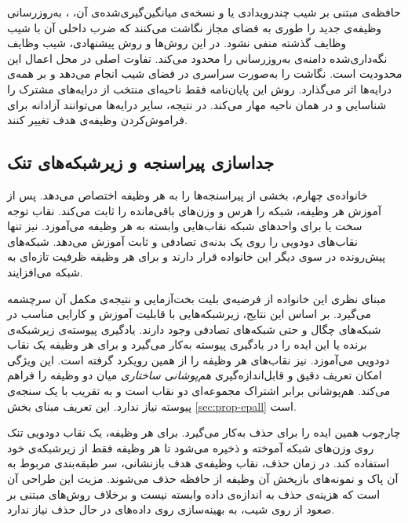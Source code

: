 {حافظه‌ی مبتنی بر شیب چندرویدادی} یا  \cite{lopezpaz2017gem} و نسخه‌ی میانگین‌گیری‌شده‌ی آن،  \cite{chaudhry2019agem}، به‌روزرسانی وظیفه‌ی جدید را طوری به فضای مجاز نگاشت می‌کنند که ضرب داخلی آن با شیب وظایف گذشته منفی نشود. در این روش‌ها و روش پیشنهادی، شیب وظایف نگه‌داری‌شده دامنه‌ی به‌روزرسانی را محدود می‌کند. تفاوت اصلی در محل اعمال این محدودیت است.  نگاشت را به‌صورت سراسری در فضای شیب انجام می‌دهد و بر همه‌ی درایه‌ها اثر می‌گذارد. روش این پایان‌نامه فقط ناحیه‌ای منتخب از درایه‌های مشترک را شناسایی و در همان ناحیه مهار می‌کند. در نتیجه، سایر درایه‌ها می‌توانند آزادانه برای فراموش‌کردن وظیفه‌ی هدف تغییر کنند.

\subsection{جداسازی پیراسنجه و زیرشبکه‌های تنک}
\label{subsec:lit-isolation}

خانواده‌ی چهارم، بخشی از پیراسنجه‌ها را به هر وظیفه اختصاص می‌دهد.  \cite{mallya2018packnet} پس از آموزش هر وظیفه، شبکه را هرس و وزن‌های باقی‌مانده را ثابت می‌کند. {نقاب توجه سخت} یا  \cite{serra2018hat} برای واحدهای شبکه نقاب‌هایی وابسته به هر وظیفه می‌آموزد.  \cite{wortsman2020supsup} نیز تنها نقاب‌های دودویی را روی یک بدنه‌ی تصادفی و ثابت آموزش می‌دهد. {شبکه‌های پیش‌رونده} \cite{rusu2016progressive} در سوی دیگر این خانواده قرار دارند و برای هر وظیفه ظرفیت تازه‌ای به شبکه می‌افزایند.

مبنای نظری این خانواده از {فرضیه‌ی بلیت بخت‌آزمایی} \cite{frankle2019lottery} و نتیجه‌ی مکمل آن \cite{ramanujan2020hidden} سرچشمه می‌گیرد. بر اساس این نتایج، زیرشبکه‌هایی با قابلیت آموزش و کارایی مناسب در شبکه‌های چگال و حتی شبکه‌های تصادفی وجود دارند. {یادگیری پیوسته‌ی زیرشبکه‌ی برنده} یا  \cite{kang2022wsn} این ایده را در یادگیری پیوسته به‌کار می‌گیرد و برای هر وظیفه یک نقاب دودویی می‌آموزد.  نیز نقاب‌های هر وظیفه را از همین رویکرد گرفته است. این ویژگی امکان تعریف دقیق و قابل‌اندازه‌گیری \emph{هم‌پوشانی ساختاری} میان دو وظیفه را فراهم می‌کند. هم‌پوشانی برابر اشتراک مجموعه‌ای دو نقاب است و به تقریب با یک سنجه‌ی پیوسته نیاز ندارد. این تعریف مبنای بخش \ref{sec:prop-epall} است.



چارچوب  \cite{ozdenizci2025pall} همین ایده را برای حذف به‌کار می‌گیرد. برای هر وظیفه، یک نقاب دودویی تنک روی وزن‌های شبکه آموخته و ذخیره می‌شود تا هر وظیفه فقط از زیرشبکه‌ی خود استفاده کند. در زمان حذف، نقاب وظیفه‌ی هدف بازنشانی، سر طبقه‌بندی مربوط به آن پاک و نمونه‌های بازپخش آن وظیفه از حافظه حذف می‌شوند. مزیت این طراحی آن است که هزینه‌ی حذف به اندازه‌ی داده وابسته نیست و برخلاف روش‌های مبتنی بر صعود از روی شیب، به بهینه‌سازی روی داده‌های در حال حذف نیاز ندارد.


